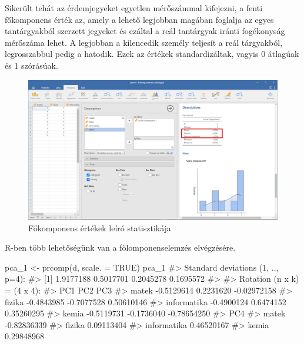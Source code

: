 \documentclass[
  letterpaper,
]{krantz}
\makeatletter
\newenvironment{Shaded}{\begin{snugshade}}{\end{snugshade}}
\newcommand{\AttributeTok}[1]{\textcolor[rgb]{0.40,0.45,0.13}{#1}}
\newcommand{\CommentTok}[1]{\textcolor[rgb]{0.37,0.37,0.37}{#1}}
\newcommand{\ConstantTok}[1]{\textcolor[rgb]{0.56,0.35,0.01}{#1}}
\newcommand{\FunctionTok}[1]{\textcolor[rgb]{0.28,0.35,0.67}{#1}}
\newcommand{\NormalTok}[1]{\textcolor[rgb]{0.00,0.23,0.31}{#1}}
\newcommand{\OtherTok}[1]{\textcolor[rgb]{0.00,0.23,0.31}{#1}}
\newenvironment{kframe}{%
\medskip{}
\setlength{\fboxsep}{.8em}
 \def\at@end@of@kframe{}%
 \ifinner\ifhmode%
  \def\at@end@of@kframe{\end{minipage}}%
  \begin{minipage}{\columnwidth}%
 \fi\fi%
 \def\FrameCommand##1{\hskip\@totalleftmargin \hskip-\fboxsep
 \colorbox{shadecolor}{##1}\hskip-\fboxsep
     \hskip-\linewidth \hskip-\@totalleftmargin \hskip\columnwidth}%
 \MakeFramed {\advance\hsize-\width
   \@totalleftmargin\z@ \linewidth\hsize
   \@setminipage}}%
 {\par\unskip\endMakeFramed%
 \at@end@of@kframe}
\renewenvironment{Shaded}{\begin{kframe}}{\end{kframe}}
\makeatother
\begin{document}
Sikerült tehát az érdemjegyeket egyetlen mérőszámmal kifejezni, a fenti
főkomponens érték az, amely a lehető legjobban magában foglalja az egyes
tantárgyakból szerzett jegyeket és ezáltal a reál tantárgyak iránti
fogékonyság mérőszáma lehet. A legjobban a kilencedik személy teljesít a
reál tárgyakból, legrosszabbul pedig a hatodik. Ezek az értékek
standardizáltak, vagyis 0 átlagúak és 1 szórásúak.

\begin{figure}

{\centering \includegraphics{./images/fokomponens_kep_06.jpg}

}

\caption{Főkomponens értékek leíró statisztikája}

\end{figure}

R-ben több lehetőségünk van a főlomponenselemzés elvégzésére.

\begin{Shaded}
\begin{Highlighting}[]
\NormalTok{pca\_1 }\OtherTok{\textless{}{-}} \FunctionTok{prcomp}\NormalTok{(d, }\AttributeTok{scale. =} \ConstantTok{TRUE}\NormalTok{)}
\NormalTok{pca\_1}
\CommentTok{\#\textgreater{} Standard deviations (1, .., p=4):}
\CommentTok{\#\textgreater{} [1] 1.9177188 0.5017701 0.2045278 0.1695572}
\CommentTok{\#\textgreater{} }
\CommentTok{\#\textgreater{} Rotation (n x k) = (4 x 4):}
\CommentTok{\#\textgreater{}                    PC1        PC2         PC3}
\CommentTok{\#\textgreater{} matek       {-}0.5129614  0.2231620 {-}0.02972158}
\CommentTok{\#\textgreater{} fizika      {-}0.4843985 {-}0.7077528  0.50610146}
\CommentTok{\#\textgreater{} informatika {-}0.4900124  0.6474152  0.35260295}
\CommentTok{\#\textgreater{} kemia       {-}0.5119731 {-}0.1736040 {-}0.78654250}
\CommentTok{\#\textgreater{}                     PC4}
\CommentTok{\#\textgreater{} matek       {-}0.82836339}
\CommentTok{\#\textgreater{} fizika       0.09113404}
\CommentTok{\#\textgreater{} informatika  0.46520167}
\CommentTok{\#\textgreater{} kemia        0.29848968}
\end{Highlighting}
\end{Shaded}
\end{document}
